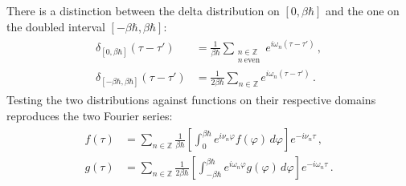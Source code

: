 \documentclass[../QFT_main.tex]{subfiles}
\begin{document}
\begin{mytheorem}
There is a distinction between the delta distribution on $[0,\beta\hbar]$ and the one on the doubled interval $[-\beta\hbar,\beta\hbar]$:
{\small\begin{align}\begin{aligned}
    \delta_{[0,\beta\hbar]}(\tau-\tau')
    &=
    \tfrac{1}{\beta\hbar}
    \sum_{\substack{n\in\mathbb Z\\ n\ \mathrm{even}}}
    e^{i\omega_n(\tau-\tau')}\,,
    \\
    \delta_{[-\beta\hbar,\beta\hbar]}(\tau-\tau')
    &=
    \tfrac{1}{2\beta\hbar}
    \sum_{n\in\mathbb Z}
    e^{i\omega_n(\tau-\tau')}\,.
\end{aligned}\end{align}}
Testing the two distributions against functions on their respective domains reproduces the two Fourier series:
{\small\begin{align}\begin{aligned}
    f(\tau)
    &=
    \sum_{n\in\mathbb Z}
    \tfrac{1}{\beta\hbar}
    \left[
        \int_0^{\beta\hbar}
        e^{i\nu_n\varphi}f(\varphi)\,d\varphi
    \right]
    e^{-i\nu_n\tau}\,,
    \\
    g(\tau)
    &=
    \sum_{n\in\mathbb Z}
    \tfrac{1}{2\beta\hbar}
    \left[
        \int_{-\beta\hbar}^{\beta\hbar}
        e^{i\omega_n\varphi}g(\varphi)\,d\varphi
    \right]
    e^{-i\omega_n\tau}\,.
\end{aligned}\end{align}}
\end{mytheorem}
\end{document}
